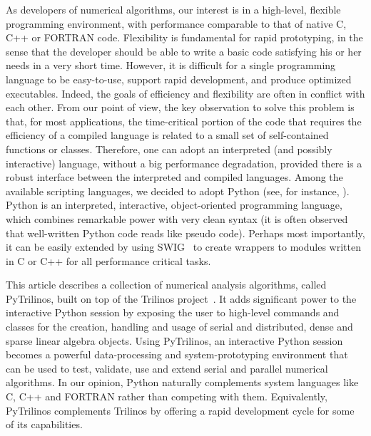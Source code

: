 \documentclass[acmtocl]{acmtrans2m}
\newcommand{\PyTrilinos}{{PyTrilinos}}
\begin{document}
As developers of numerical algorithms, our interest is in a
high-level, flexible programming environment, with performance
comparable to that of native C, C++ or FORTRAN code. Flexibility is
fundamental for rapid prototyping, in the sense that the developer
should be able to write a basic code satisfying his or her needs in
a very short time.  However, it is difficult for a single
programming language to be easy-to-use, support rapid development,
and produce optimized executables. Indeed, the goals of efficiency
and flexibility are often in conflict with each other. From our
point of view, the key observation to solve this problem is that,
for most applications, the time-critical portion of the code that
requires the efficiency of a compiled language is related to a small
set of self-contained functions or classes. Therefore, one can adopt
an interpreted (and possibly interactive) language, without a big
performance degradation, provided there is a robust interface
between the interpreted and compiled languages. Among the available
scripting languages, we decided to adopt Python (see, for instance,
\cite{python-book}).  Python is an interpreted, interactive,
object-oriented programming language, which combines remarkable
power with very clean syntax (it is often observed that well-written
Python code reads like pseudo code).  Perhaps most importantly, it
can be easily extended by using SWIG~\cite{swig} to create wrappers
to modules written in C or C++ for all performance critical tasks.

This article describes a collection of numerical analysis
algorithms, called PyTrilinos, built on top of the Trilinos
project~\cite{Trilinos-home-page,Heroux:2005:OTP}.  It adds
significant power to the interactive Python session by exposing the
user to high-level commands and classes for the creation, handling
and usage of serial and distributed, dense and sparse linear algebra
objects. Using \PyTrilinos, an interactive Python session becomes a
powerful data-processing and system-prototyping environment that can
be used to test, validate, use and extend serial and parallel
numerical algorithms. In our opinion, Python naturally complements
system languages like C, C++ and FORTRAN rather than competing with
them. Equivalently, PyTrilinos complements Trilinos by offering a
rapid development cycle for some of its capabilities.

\end{document}
